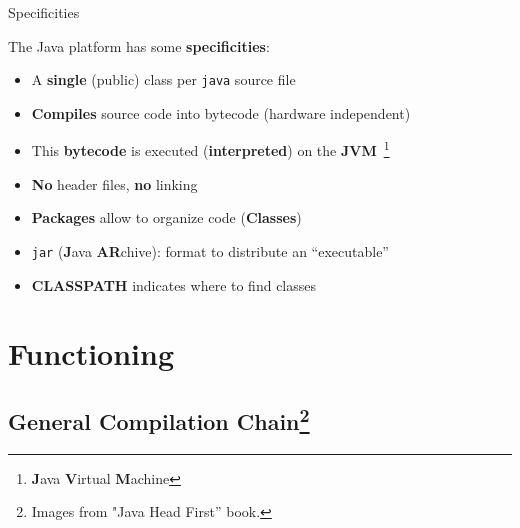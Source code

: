 \documentclass[English,c,%
hyperref={%
    pdftitle={FISA-DE2 OOP in Java},%
    pdfauthor={Muller, Gravier, Laforest, Subercaze},%
    pdfsubject={OOP in Java},%
    pdfkeywords={OOP, Java},%
    colorlinks=true,%
    urlcolor=blue,%
    linkcolor=%
    },%
xcolor={pdftex,svgnames} %
]{beamer}
\begin{document}
\begin{frame}{Specificities}

  The Java platform has some \textbf{specificities}:
  \medskip
  \begin{itemize}
    \item A \textbf{single} (public) class per \texttt{java} source file
    \medskip
    \item \textbf{Compiles} source code into bytecode (hardware independent)
    \medskip
    \item This \textbf{bytecode} is executed (\textbf{interpreted}) on the \textbf{JVM}~\footnote{\textbf{J}ava \textbf{V}irtual \textbf{M}achine}
    \medskip
    \item \textbf{No} header files, \textbf{no} linking
    \medskip
    \item \textbf{Packages} allow to organize code (\textbf{Classes})
    \medskip
    \item \texttt{jar} (\textbf{J}ava \textbf{AR}chive): format to distribute an ``executable''
    \medskip
    \item \textbf{CLASSPATH} indicates where to find classes
  \end{itemize}

\end{frame}




\section{Functioning}

\subsection{General Compilation Chain\footnote{Images from "Java Head First'' book.}}
\end{document}
